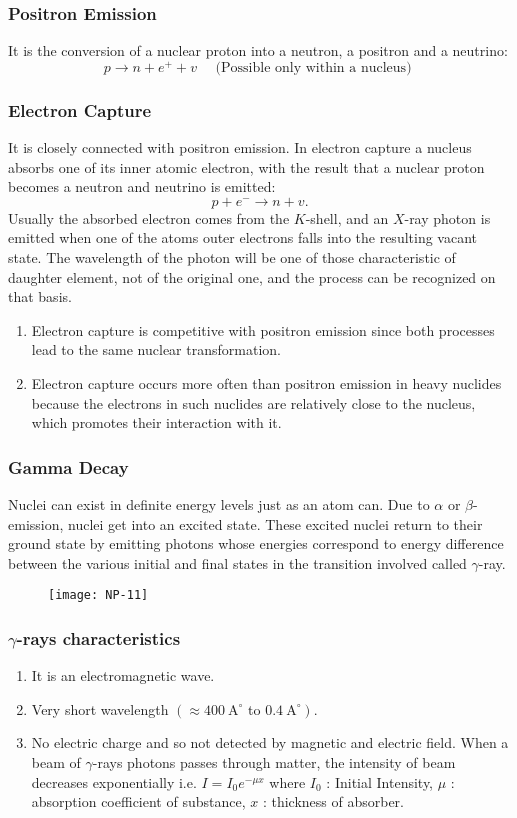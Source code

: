 \subsubsection{Positron Emission}
It is the conversion of a nuclear proton into a neutron, a positron and a neutrino:
$$
p \rightarrow n+e^{+}+v \quad \text { (Possible only within a nucleus) }
$$
\subsubsection{Electron Capture}
It is closely connected with positron emission. In electron capture a nucleus absorbs one of its inner atomic electron, with the result that a nuclear proton becomes a neutron and neutrino is emitted:
$$
p+e^{-} \rightarrow n+v .
$$
Usually the absorbed electron comes from the $K$-shell, and an $X$-ray photon is emitted when one of the atoms outer electrons falls into the resulting vacant state. The wavelength of the photon will be one of those characteristic of daughter element, not of the original one, and the process can be recognized on that basis.
\begin{note}
	\begin{enumerate}
		\item Electron capture is competitive with positron emission since both processes lead to the same nuclear transformation.
		\item Electron capture occurs more often than positron emission in heavy nuclides because the electrons in such nuclides are relatively close to the nucleus, which promotes their interaction with it.
	\end{enumerate}
\end{note}
\subsubsection{Gamma Decay}
Nuclei can exist in definite energy levels just as an atom can. Due to $\alpha$ or $\beta$-emission, nuclei get into an excited state. These excited nuclei return to their ground state by emitting photons whose energies correspond to energy difference between the various initial and final states in the transition involved called $\gamma$-ray.
\begin{figure}[H]
	\centering
	\texttt{[image: NP-11]}
	\caption{}
	\label{}
\end{figure}
\subsubsection{$\gamma$-rays characteristics}
\begin{enumerate}
	\item It is an electromagnetic wave.
	\item Very short wavelength $\left(\approx 400 \mathrm{~A}^{\circ}\right.$ to $\left.0.4 \mathrm{~A}^{\circ}\right)$.
	\item No electric charge and so not detected by magnetic and electric field.
	When a beam of $\gamma$-rays photons passes through matter, the intensity of beam decreases exponentially i.e. $I=I_0 e^{-\mu x}$ where $I_0$ : Initial Intensity, $\mu$ : absorption coefficient of substance, $x$ : thickness of absorber.
\end{enumerate}
